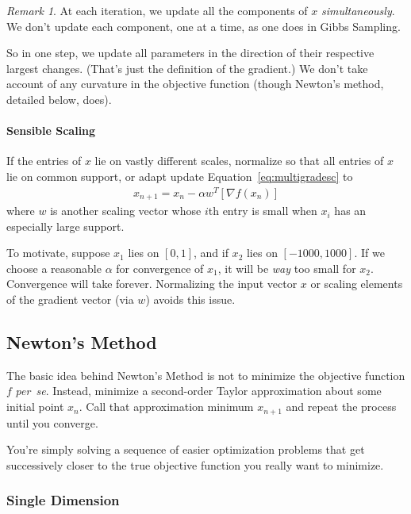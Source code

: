 \documentclass[a4paper,12pt]{scrartcl}
\theoremstyle{definition}
\theoremstyle{remark}
\newtheorem*{rmk}{Remark}
\begin{document}
\begin{rmk}
At each iteration, we update all the components of $x$
\emph{simultaneously}.  We don't update each component, one at a time,
as one does in Gibbs Sampling.

So in one step, we update all parameters in the direction of their
respective largest changes. (That's just the definition of the
gradient.) We don't take account of any curvature in the objective
function (though Newton's method, detailed below, does).
\end{rmk}

\paragraph{Sensible Scaling}
If the entries of $x$ lie on vastly different scales, normalize so that
all entries of $x$ lie on common support, or adapt update
Equation~\ref{eq:multigradesc} to
\begin{align}
  x_{n+1} = x_n - \alpha w^T [\nabla f(x_n)]
\end{align}
where $w$ is another scaling vector whose $i$th entry is small when
$x_i$ has an especially large support.

To motivate, suppose $x_1$ lies on $[0,1]$, and if $x_2$ lies on
$[-1000, 1000]$. If we choose a reasonable $\alpha$ for convergence of
$x_1$, it will be \emph{way} too small for $x_2$. Convergence will take
forever. Normalizing the input vector $x$ or scaling elements of the
gradient vector (via $w$) avoids this issue.


\subsection{Newton's Method}

The basic idea behind Newton's Method is not to minimize the objective
function $f$ \emph{per~se}. Instead, minimize a second-order Taylor
approximation about some initial point $x_n$. Call that approximation
minimum $x_{n+1}$ and repeat the process until you converge.

You're simply solving a  sequence of easier optimization problems that
get successively closer to the true objective function you really want
to minimize.


\subsubsection{Single Dimension}
\end{document}
